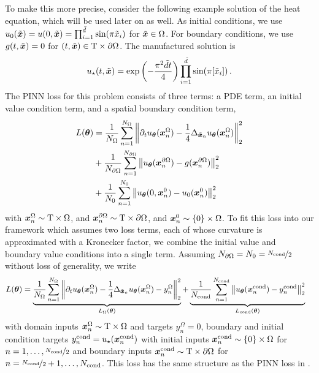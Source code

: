 To make this more precise, consider the following example solution of the heat equation, which will be used later on as well.
As initial conditions, we use $u_0(\tilde{{\bm{x}}}) = u(0, \tilde{{\bm{x}}}) = \prod_{i=1}^{\tilde{d}} \sin(\pi \tilde{{x}}_i)$ for $\tilde{{\bm{x}}} \in \Omega$.
For boundary conditions, we use $g(t, \tilde{{\bm{x}}}) = 0$ for $(t, \tilde{{\bm{x}}}) \in \mathrm{T} \times \partial\Omega$.
The manufactured solution is
\begin{align*}
  u_{\star}(t, \tilde{{\bm{x}}})
  =
  \exp \left(-\frac{\pi^2 \tilde{d} t}{4} \right)
  \prod_{i=1}^{\tilde{d}} \sin(\pi [\tilde{{x}}_i])\,.
\end{align*}
The PINN loss for this problem consists of three terms: a PDE term, an initial value condition term, and a spatial boundary condition term,
\begin{align*}
  L({\bm{\theta}})
  &=
    \frac{1}{N_{\Omega}}
    \sum_{n=1}^{N_{\Omega}}
    \left\lVert
    \partial_t u_{{\bm{\theta}}}({\bm{x}}_n^{\Omega})
    -
    \frac{1}{4} \Delta_{\tilde{{\bm{x}}}_n} u_{{\bm{\theta}}}({\bm{x}}_n^{\Omega})
    \right\rVert^2_2
  \\
  &+
    \frac{1}{N_{\partial\Omega}}
    \sum_{n=1}^{N_{\partial\Omega}}
    \left\lVert
    u_{{\bm{\theta}}}({\bm{x}}_n^{\partial\Omega})
    -
    g({\bm{x}}_n^{\partial\Omega})
    \right\rVert^2_2
  \\
  &+
    \frac{1}{N_0}
    \sum_{n=1}^{N_0}
    \left\lVert
    u_{{\bm{\theta}}}(0, {\bm{x}}_n^0)
    -
    u_0( {\bm{x}}_n^0)
    \right\rVert^2_2
\end{align*}
with ${\bm{x}}_n^{\Omega} \sim \mathrm{T} \times \Omega$, and ${\bm{x}}_n^{\partial\Omega} \sim \mathrm{T} \times \partial\Omega$, and ${\bm{x}}_n^0 \sim \{0\} \times \Omega$.
To fit this loss into our framework which assumes two loss terms, each of whose curvature is approximated with a Kronecker factor, we combine the initial value and boundary value conditions into a single term.
Assuming $N_{\partial \Omega} = N_0 = \nicefrac{N_{\text{cond}}}{2}$ without loss of generality, we write
\begin{align*}
  L({\bm{\theta}})
  &=
    \underbrace{
    \frac{1}{N_{\Omega}}
    \sum_{n=1}^{N_{\Omega}}
    \left\lVert
    \partial_t u_{{\bm{\theta}}}({\bm{x}}_n^{\Omega})
    -
    \frac{1}{4} \Delta_{\tilde{{\bm{x}}}_n} u_{{\bm{\theta}}}({\bm{x}}_n^{\Omega})
    - y_n^{\Omega}
    \right\rVert^2_2
    }_{L_{\Omega}({\bm{\theta}})}
  +
    \underbrace{
    \frac{1}{N_{\text{cond}}}
    \sum_{n=1}^{N_{\text{cond}}}
    \left\lVert
    u_{{\bm{\theta}}}({\bm{x}}_n^{\text{cond}})
    -
    y_n^{\text{cond}}
    \right\rVert^2_2
    }_{L_{\text{cond}}({\bm{\theta}})}
\end{align*}
with domain inputs ${\bm{x}}_n^{\Omega} \sim \mathrm{T} \times \Omega$ and targets $y_n^{\Omega} = 0$, boundary and initial condition targets $y_n^{\text{cond}} = u_\star({\bm{x}}_n^{\text{cond}})$ with initial inputs ${\bm{x}}_n^{\text{cond}} \sim \{0\} \times \Omega$ for $n = 1, \dots, \nicefrac{N_{\text{cond}}}{2}$ and boundary inputs ${\bm{x}}_n^{\text{cond}} \sim \mathrm{T} \times \partial\Omega$ for $n = \nicefrac{N_{\text{cond}}}{2}+1, \dots, N_{\text{cond}}$.
This loss has the same structure as the PINN loss in .

